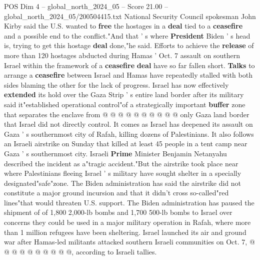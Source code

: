 \begin{textsample}{POS Dim 4 – global\_north\_2024\_05 – Score 21.00 – global\_north\_2024\_05/200504415.txt}
National Security Council spokesman John Kirby said the U.S. wanted to \textbf{free} the hostages in a \textbf{deal} tied to a \textbf{ceasefire} and a possible end to the conflict."And that ' s where \textbf{President} Biden ' s head is, trying to get this hostage \textbf{deal} done,"he said.
Efforts to achieve the \textbf{release} of more than 120 hostages abducted during Hamas ' Oct. 7 assault on southern Israel within the framework of a \textbf{ceasefire} \textbf{deal} have so far fallen short. \textbf{Talks} to arrange a \textbf{ceasefire} between Israel and Hamas have repeatedly stalled with both sides blaming the other for the lack of progress.
Israel has now effectively \textbf{extended} its hold over the Gaza Strip ' s entire land border after its military said it"established operational control"of a strategically important \textbf{buffer} zone that separates the enclave from @ @ @ @ @ @ @ @ @ @ only Gaza land border that Israel did not directly control.
It comes as Israel has deepened its assault on Gaza ' s southernmost city of Rafah, killing dozens of Palestinians.
It also follows an Israeli airstrike on Sunday that killed at least 45 people in a tent camp near Gaza ' s southernmost city.
Israeli \textbf{Prime} Minister Benjamin Netanyahu described the incident as a"tragic accident."But the airstrike took place near where Palestinians fleeing Israel ' s military have sought shelter in a specially designated"safe"zone.
The Biden administration has said the airstrike did not constitute a major ground incursion and that it didn't cross so-called"red lines"that would threaten U.S. support.
The Biden administration has paused the shipment of of 1,800 2,000-lb bombs and 1,700 500-lb bombs to Israel over concerns they could be used in a major military operation in Rafah, where more than 1 million refugees have been sheltering.
Israel launched its air and ground war after Hamas-led militants attacked southern Israeli communities on Oct. 7, @ @ @ @ @ @ @ @ @ @, according to Israeli tallies.

\end{textsample}

